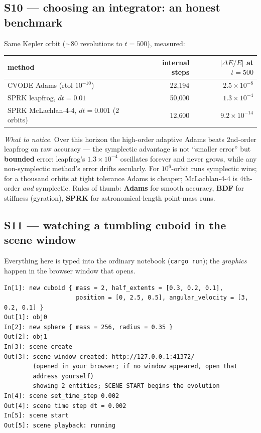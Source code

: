 \documentclass[11pt]{article}
\newcommand{\code}[1]{\texttt{#1}}
\begin{document}
\subsection{S10 --- choosing an integrator: an honest benchmark}

Same Kepler orbit ($\sim$80 revolutions to $t=500$), measured:

\begin{center}
\begin{tabular}{lrr}
\textbf{method} & \textbf{internal steps} & $|\Delta E/E|$ at $t{=}500$\\\hline
CVODE Adams (rtol $10^{-10}$) & 22{,}194 & $2.5\times10^{-8}$\\
SPRK leapfrog, $dt=0.01$ & 50{,}000 & $1.3\times10^{-4}$\\
SPRK McLachlan-4-4, $dt=0.001$ (2 orbits) & 12{,}600 & $9.2\times10^{-14}$\\
\end{tabular}
\end{center}

\emph{What to notice.} Over this horizon the high-order adaptive Adams
beats 2nd-order leapfrog on raw accuracy --- the symplectic advantage
is not ``smaller error'' but \textbf{bounded} error: leapfrog's
$1.3\times10^{-4}$ oscillates forever and never grows, while any
non-symplectic method's error drifts secularly. For $10^{6}$-orbit runs
symplectic wins; for a thousand orbits at tight tolerance Adams is
cheaper; McLachlan-4-4 is 4th-order \emph{and} symplectic. Rules of
thumb: \textbf{Adams} for smooth accuracy, \textbf{BDF} for stiffness
(gyration), \textbf{SPRK} for astronomical-length point-mass runs.

\subsection{S11 --- watching a tumbling cuboid in the scene window}

Everything here is typed into the ordinary notebook (\code{cargo run});
the \emph{graphics} happen in the browser window that opens.

\begin{lstlisting}
In[1]: new cuboid { mass = 2, half_extents = [0.3, 0.2, 0.1],
                    position = [0, 2.5, 0.5], angular_velocity = [3, 0.2, 0.1] }
Out[1]: obj0
In[2]: new sphere { mass = 256, radius = 0.35 }
Out[2]: obj1
In[3]: scene create
Out[3]: scene window created: http://127.0.0.1:41372/
        (opened in your browser; if no window appeared, open that
        address yourself)
        showing 2 entities; SCENE START begins the evolution
In[4]: scene set_time_step 0.002
Out[4]: scene time step dt = 0.002
In[5]: scene start
Out[5]: scene playback: running
\end{lstlisting}
\end{document}
